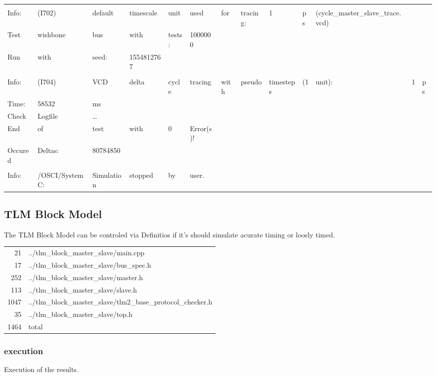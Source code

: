 \documentclass[11pt]{article}
\begin{document}
\begin{center}
\begin{tabular}{lllllllllllrl}
 &  &  &  &  &  &  &  &  &  &  &  & \\
Info: & (I702) & default & timescale & unit & used & for & tracing: & 1 & ps & (cycle\_master\_slave\_trace.vcd) &  & \\
Test & wishbone & bus & with & tests: & 1000000 &  &  &  &  &  &  & \\
Run & with & seed: & 1554812767 &  &  &  &  &  &  &  &  & \\
 &  &  &  &  &  &  &  &  &  &  &  & \\
Info: & (I704) & VCD & delta & cycle & tracing & with & pseudo & timesteps & (1 & unit): & 1 & ps\\
Time: & 58532 & ms &  &  &  &  &  &  &  &  &  & \\
Check & Logfile & \ldots{} &  &  &  &  &  &  &  &  &  & \\
End & of & test & with & 0 & Error(s)! &  &  &  &  &  &  & \\
Occured & Deltas: & 80784850 &  &  &  &  &  &  &  &  &  & \\
 &  &  &  &  &  &  &  &  &  &  &  & \\
Info: & /OSCI/SystemC: & Simulation & stopped & by & user. &  &  &  &  &  &  & \\
\end{tabular}
\end{center}

\subsection{TLM Block Model}
\label{sec:orgb9f621c}
The TLM Block Model can be controled via Definitios if it's should
simulate acurate timing or loosly timed.

\begin{center}
\begin{tabular}{rl}
21 & ../tlm\_block\_master\_slave/main.cpp\\
17 & ../tlm\_block\_master\_slave/bus\_spec.h\\
252 & ../tlm\_block\_master\_slave/master.h\\
113 & ../tlm\_block\_master\_slave/slave.h\\
1047 & ../tlm\_block\_master\_slave/tlm2\_base\_protocol\_checker.h\\
35 & ../tlm\_block\_master\_slave/top.h\\
1464 & total\\
\end{tabular}
\end{center}

\subsubsection{execution}
\label{sec:orgcb57ba9}
Execution of the results.
\end{document}
